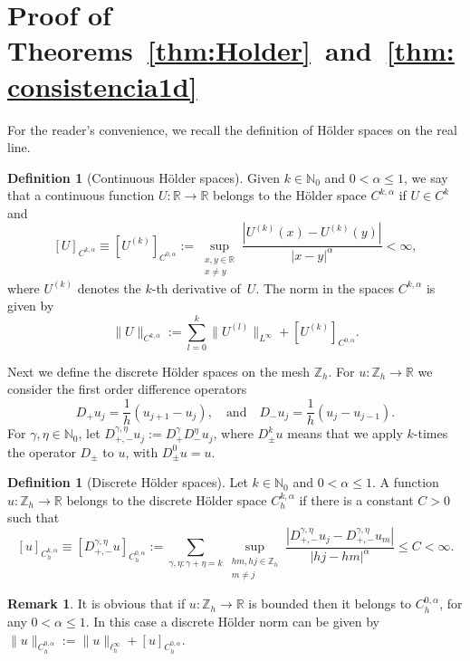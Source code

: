\documentclass[a4paper,11pt,reqno]{amsart}
\newcommand{\R}{\mathbb{R}}
\newcommand{\Z}{\mathbb{Z}}
\newcommand{\N}{\mathbb{N}}
\theoremstyle{definition}
\newtheorem{defn}[thm]{Definition}
\newtheorem{rem}[thm]{Remark}
\numberwithin{equation}{section}
\begin{document}
\section{Proof of Theorems~\ref{thm:Holder}~and~\ref{thm:consistencia1d}}
\label{Section:dosteoremas}

For the reader's convenience, we recall the definition of H\"older spaces on the real line.

\begin{defn}[Continuous H\"older spaces]
\label{def:contH}
Given $k\in \N_0$ and $0<\alpha\leq1$, we say that
a continuous function $U:\R\to\R$ belongs to the H\"older space $C^{k,\alpha}$ if $U\in C^k$ and
\[
[U]_{C^{k,\alpha}} \equiv[U^{(k)}]_{C^{0,\alpha}} := \sup_{\substack{x,y\in \R\\x\neq y}}
\frac{|U^{(k)}(x)-U^{(k)}(y)|}{|x-y|^{\alpha}}<\infty,
\]
where $U^{(k)}$ denotes the $k$-th derivative of~$U$. The norm in the spaces $C^{k,\alpha}$ is given by
\[
\|U\|_{C^{k,\alpha}} := \sum_{l=0}^k\|U^{(l)}\|_{L^\infty} +[U^{(k)}]_{C^{0,\alpha}}.
\]
\end{defn}

Next we define the discrete H\"older spaces on the mesh $\Z_h$.
For $u:\Z_h\to\R$ we consider the first order difference operators
\begin{equation}
\label{eq:definitiondiscretederivatives}
D_+u_{j}=\frac{1}{h}(u_{j+1}-u_{j}),\quad\text{and}\quad
D_-u_{j}=\frac{1}{h}(u_{j}-u_{j-1}).
\end{equation}
For $\gamma, \eta\in \N_0$,
let $D_{+,-}^{\gamma,\eta}u_j:=D_{+}^{\gamma}
D_{-}^{\eta}u_j$, where
$D_{\pm}^{k}u$ means that we apply $k$-times the operator $D_{\pm}$ to $u$,
with $D_{\pm}^0u=u$.

\begin{defn}[Discrete H\"older spaces]
\label{def:discreteH}
Let $k\in \N_0$ and $0<\alpha\le1$. A
function $u:\Z_h\to\R$ belongs to the discrete H\"older space $C_h^{k,\alpha}$ if
there is a constant $C>0$ such that
\[
[u]_{C^{k,\alpha}_h}\equiv[D_{+,-}^{\gamma,\eta}u]_{C_h^{0,\alpha}} :=
\sum_{\gamma,\eta:\gamma+\eta=k}\sup_{\substack{hm,hj\in\Z_h\\m\neq j}}\frac{|D_{+,-}^{\gamma,\eta}u_{j}-
D_{+,-}^{\gamma,\eta} u_{m}|}{|hj-hm|^{\alpha}}\leq C<\infty.
\]
\end{defn}

\begin{rem}
It is obvious that if $u:\Z_h\to\R$ is bounded then it belongs to $C^{0,\alpha}_h$, for any $0<\alpha\leq1$.
In this case a discrete H\"older norm can be given by
$\|u\|_{C_h^{0,\alpha}}:=\|u\|_{\ell^\infty_h}+[u]_{C_h^{0,\alpha}}$.
\end{rem}
\end{document}

